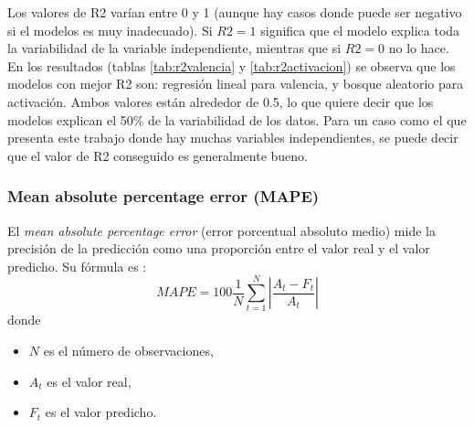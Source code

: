 \documentclass[12pt,a4paper]{article}
\begin{document}
Los valores de R2 varían entre 0 y 1 (aunque hay casos donde puede ser negativo si el modelos es muy inadecuado). Si $R2 = 1$ significa que el modelo explica toda la variabilidad de la variable independiente, mientras que si $R2 = 0$ no lo hace. En los resultados (tablas \ref{tab:r2valencia} y \ref{tab:r2activacion}) se observa que los modelos con mejor R2 son: regresión lineal para valencia, y bosque aleatorio para activación. Ambos valores están alrededor de 0.5, lo que quiere decir que los modelos explican el 50\% de la variabilidad de los datos. Para un caso como el que presenta este trabajo donde hay muchas variables independientes, se puede decir que el valor de R2 conseguido es generalmente bueno.

\subsubsection{Mean absolute percentage error (MAPE)}\label{mape}
El \textit{mean absolute percentage error} (error porcentual absoluto medio) mide la precisión de la predicción como una proporción entre el valor real y el valor predicho. Su fórmula es \cite{enwiki:1225070385}:
\begin{equation}
	MAPE = 100 \frac{1}{N} \sum_{t=1}^{N} |\frac{A_t - F_t}{A_t}|
\end{equation}
donde
\begin{itemize}
	\item $N$ es el número de observaciones,
	\item $A_t$ es el valor real,
	\item $F_t$ es el valor predicho.
\end{itemize}
\end{document}
